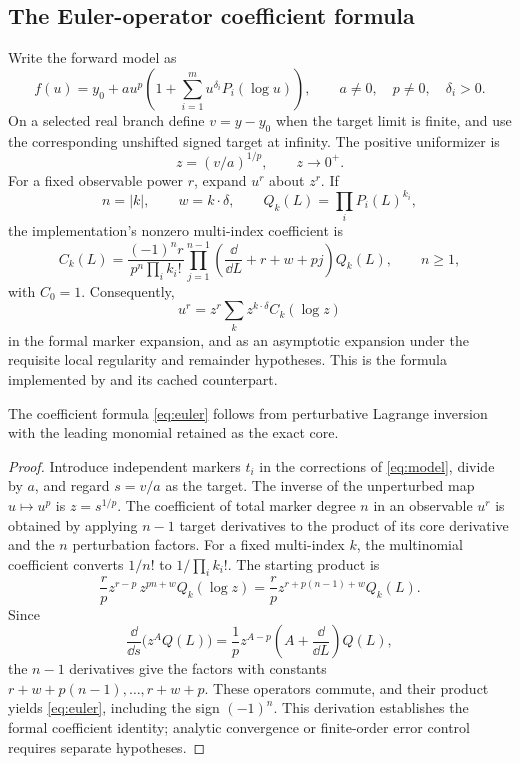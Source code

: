 \subsection{The Euler-operator coefficient formula}
Write the forward model as
\begin{equation}\label{eq:model}
 f(u)=y_0+a u^p\left(1+\sum_{i=1}^{m}u^{\delta_i}P_i(\log u)\right),
 \qquad a\ne0,\quad p\ne0,\quad\delta_i>0.
\end{equation}
On a selected real branch define $v=y-y_0$ when the target limit is finite, and use the corresponding unshifted signed target at infinity. The positive uniformizer is
\[
 z=(v/a)^{1/p},\qquad z\to0^+.
\]
For a fixed observable power $r$, expand $u^r$ about $z^r$. If
\[
 n=|k|,\qquad w=k\cdot\delta,\qquad Q_k(L)=\prod_iP_i(L)^{k_i},
\]
the implementation's nonzero multi-index coefficient is
\begin{equation}\label{eq:euler}
 C_k(L)=\frac{(-1)^n r}{p^n\prod_i k_i!}
 \prod_{j=1}^{n-1}\left(\frac{\dd}{\dd L}+r+w+pj\right)Q_k(L),
 \qquad n\ge1,
\end{equation}
with $C_0=1$. Consequently,
\begin{equation}\label{eq:inverseformal}
 u^r=z^r\sum_k z^{k\cdot\delta}C_k(\log z)
\end{equation}
in the formal marker expansion, and as an asymptotic expansion under the requisite local regularity and remainder hypotheses. This is the formula implemented by  and its cached counterpart.\cite{core,incremental,repoarticle}

\begin{proposition}
The coefficient formula \eqref{eq:euler} follows from perturbative Lagrange inversion with the leading monomial retained as the exact core.
\end{proposition}
\begin{proof}
Introduce independent markers $t_i$ in the corrections of \eqref{eq:model}, divide by $a$, and regard $s=v/a$ as the target. The inverse of the unperturbed map $u\mapsto u^p$ is $z=s^{1/p}$. The coefficient of total marker degree $n$ in an observable $u^r$ is obtained by applying $n-1$ target derivatives to the product of its core derivative and the $n$ perturbation factors. For a fixed multi-index $k$, the multinomial coefficient converts $1/n!$ to $1/\prod_i k_i!$. The starting product is
\[
 \frac r p z^{r-p}\,z^{pn+w}Q_k(\log z)
 =\frac r p z^{r+p(n-1)+w}Q_k(L).
\]
Since
\[
 \frac{\dd}{\dd s}\bigl(z^A Q(L)\bigr)
 =\frac1p z^{A-p}\left(A+\frac{\dd}{\dd L}\right)Q(L),
\]
the $n-1$ derivatives give the factors with constants
$r+w+p(n-1),\ldots,r+w+p$. These operators commute, and their product yields \eqref{eq:euler}, including the sign $(-1)^n$. This derivation establishes the formal coefficient identity; analytic convergence or finite-order error control requires separate hypotheses.
\end{proof}

